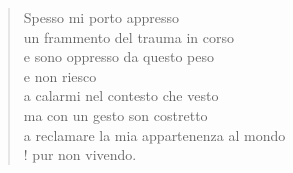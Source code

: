 
\begin{verse}
    Spesso mi porto appresso\\
    un frammento del trauma in corso\\
    e sono oppresso da questo peso\\
    e non riesco\\
    a calarmi nel contesto che vesto\\
    ma con un gesto son costretto\\
    a reclamare la mia appartenenza al mondo\\!
    pur non vivendo.    
\end{verse}
